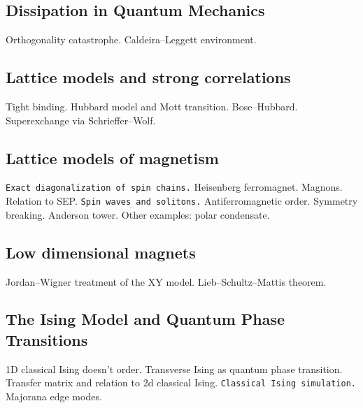 \subsection{Dissipation in Quantum Mechanics}

Orthogonality catastrophe. Caldeira--Leggett environment.

\subsection{Lattice models and strong correlations}

Tight binding. Hubbard model and Mott transition. Bose--Hubbard. Superexchange via Schrieffer--Wolf.

\subsection{Lattice models of magnetism}

\verb|Exact diagonalization of spin chains.| Heisenberg ferromagnet. Magnons. Relation to SEP. \verb|Spin waves and solitons.|
Antiferromagnetic order. Symmetry breaking. Anderson tower. Other examples: polar condensate.

\subsection{Low dimensional magnets}

Jordan--Wigner treatment of the XY model. Lieb--Schultz--Mattis theorem.

\subsection{The Ising Model and Quantum Phase Transitions}

1D classical Ising doesn't order. Transverse Ising as quantum phase transition. Transfer matrix and relation to 2d classical Ising. \verb|Classical Ising simulation.| Majorana edge modes.








